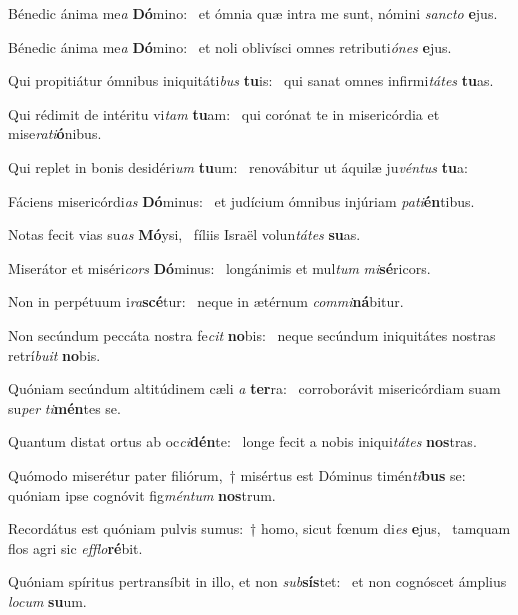 \item Bénedic ánima me\textit{a} \textbf{Dó}mino:~\psstar{} et ómnia quæ intra me sunt, nómini \textit{sancto} \textbf{e}jus.
\item Bénedic ánima me\textit{a} \textbf{Dó}mino:~\psstar{} et noli oblivísci omnes retributi\textit{ónes} \textbf{e}jus.
\item Qui propitiátur ómnibus iniquitáti\textit{bus} \textbf{tu}is:~\psstar{} qui sanat omnes infirmi\textit{tátes} \textbf{tu}as.
\item Qui rédimit de intéritu vi\textit{tam} \textbf{tu}am:~\psstar{} qui corónat te in misericórdia et mise\textit{rati}\textbf{ó}nibus.
\item Qui replet in bonis desidéri\textit{um} \textbf{tu}um:~\psstar{} renovábitur ut áquilæ ju\textit{véntus} \textbf{tu}a:
\item Fáciens misericórdi\textit{as} \textbf{Dó}mi\-nus:~\psstar{} et judícium ómnibus injúriam \textit{pati}\textbf{én}tibus.
\item Notas fecit vias su\textit{as} \textbf{Mó}ysi,~\psstar{} fíliis Israël volun\textit{tátes} \textbf{su}as.
\item Miserátor et miséri\textit{cors} \textbf{Dó}minus:~\psstar{} longánimis et mul\textit{tum} \textit{mi}\textbf{sé}ricors.
\item Non in perpétuum i\textit{ra}\textbf{scé}tur:~\psstar{} neque in ætérnum \textit{commi}\textbf{ná}bi\-tur.
\item Non secúndum peccáta nostra fe\textit{cit} \textbf{no}bis:~\psstar{} neque secúndum iniquitátes nostras retrí\textit{buit} \textbf{no}bis.
\item Quóniam secúndum altitúdinem cæli \textit{a} \textbf{ter}ra:~\psstar{} corroborávit misericórdiam suam su\textit{per} \textit{ti}\textbf{mén}tes se.
\item Quantum distat ortus ab oc\textit{ci}\textbf{dén}te:~\psstar{} longe fecit a nobis iniqui\textit{tátes} \textbf{nos}tras.
\item Quómodo miserétur pater filiórum,~† misértus est Dóminus timén\textit{ti}\textbf{bus} se:~\psstar{} quóniam ipse cognóvit fig\textit{méntum} \textbf{nos}trum.
\item Recordátus est quóniam pulvis sumus:~† homo, sicut fœnum di\textit{es} \textbf{e}jus,~\psstar{} tamquam flos agri sic \textit{efflo}\textbf{ré}bit.
\item Quóniam spíritus pertransíbit in illo, et non \textit{sub}\textbf{sís}tet:~\psstar{} et non cognóscet ámplius \textit{locum} \textbf{su}um.
